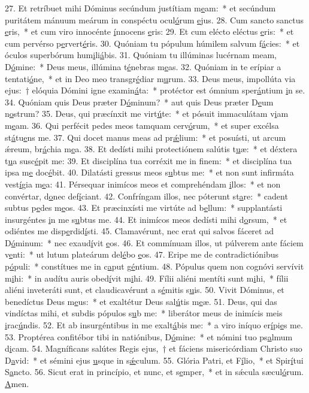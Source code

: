 27. Et retríbuet mihi Dóminus secúndum justítiam m\uline{e}am:~* et secúndum puritátem mánuum meárum in conspéctu ocul\uline{ó}rum \uline{e}jus.
28. Cum sancto sanctus \uline{e}ris,~* et cum viro innocénte \uline{í}nnocens \uline{e}ris:
29. Et cum elécto eléctus \uline{e}ris:~* et cum pervérso p\uline{e}rvert\uline{é}ris.
30. Quóniam tu pópulum húmilem salvum f\uline{á}cies:~* et óculos superbórum hum\uline{i}li\uline{á}bis.
31. Quóniam tu illúminas lucérnam meam, D\uline{ó}mine:~* Deus meus, illúmina t\uline{é}nebras m\uline{e}as.
32. Quóniam in te erípiar a tentati\uline{ó}ne,~* et in Deo meo transgr\uline{é}diar m\uline{u}rum.
33. Deus meus, impollúta via ejus:~† elóquia Dómini igne examin\uline{á}ta:~* protéctor est ómnium sper\uline{á}ntium \uline{i}n se.
34. Quóniam quis Deus præter D\uline{ó}minum?~* aut quis Deus præter D\uline{e}um n\uline{o}strum?
35. Deus, qui præcínxit me virt\uline{ú}te:~* et pósuit immaculátam v\uline{i}am m\uline{e}am.
36. Qui perfécit pedes meos tamquam cerv\uline{ó}rum,~* et super excélsa st\uline{á}tu\uline{e}ns me.
37. Qui docet manus meas ad pr\uline{ǽ}lium:~* et posuísti, ut arcum ǽreum, br\uline{á}chia m\uline{e}a.
38. Et dedísti mihi protectiónem salútis t\uline{u}æ:~* et déxtera t\uline{u}a susc\uline{é}pit me:
39. Et disciplína tua corréxit me in f\uline{i}nem:~* et disciplína tua ipsa m\uline{e} doc\uline{é}bit.
40. Dilatásti gressus meos s\uline{u}btus me:~* et non sunt infirmáta vest\uline{í}gia m\uline{e}a:
41. Pérsequar inimícos meos et comprehéndam \uline{i}llos:~* et non convértar, d\uline{o}nec def\uline{í}ciant.
42. Confríngam illos, nec póterunt st\uline{a}re:~* cadent subtus p\uline{e}des m\uline{e}os.
43. Et præcinxísti me virtúte ad b\uline{e}llum:~* supplantásti insurgéntes \uline{i}n me s\uline{u}btus me.
44. Et inimícos meos dedísti mihi d\uline{o}rsum,~* et odiéntes me disp\uline{e}rdid\uline{í}sti.
45. Clamavérunt, nec erat qui salvos fáceret ad D\uline{ó}minum:~* nec exaud\uline{í}vit \uline{e}os.
46. Et commínuam illos, ut púlverem ante fáciem v\uline{e}nti:~* ut lutum plateárum del\uline{é}bo \uline{e}os.
47. Eripe me de contradictiónibus p\uline{ó}puli:~* constítues me in c\uline{a}put g\uline{é}ntium.
48. Pópulus quem non cognóvi servívit m\uline{i}hi:~* in audítu auris obed\uline{í}vit m\uline{i}hi.
49. Fílii aliéni mentíti sunt m\uline{i}hi,~* fílii aliéni inveteráti sunt, et claudicavérunt a s\uline{é}mitis s\uline{u}is.
50. Vivit Dóminus, et benedíctus Deus m\uline{e}us:~* et exaltétur Deus sal\uline{ú}tis m\uline{e}æ.
51. Deus, qui das vindíctas mihi, et subdis pópulos s\uline{u}b me:~* liberátor meus de inimícis meis \uline{i}rac\uline{ú}ndis.
52. Et ab insurgéntibus in me exalt\uline{á}bis me:~* a viro iníquo er\uline{í}pi\uline{e}s me.
53. Proptérea confitébor tibi in natiónibus, D\uline{ó}mine:~* et nómini tuo ps\uline{a}lmum d\uline{i}cam.
54. Magníficans salútes Regis ejus,~† et fáciens misericórdiam Christo suo D\uline{a}vid:~* et sémini ejus \uline{u}sque in s\uline{ǽ}culum.
55. Glória Patri, et F\uline{í}lio,~* et Spir\uline{í}tui S\uline{a}ncto.
56. Sicut erat in princípio, et nunc, et s\uline{e}mper,~* et in sǽcula sæcul\uline{ó}rum. \uline{A}men.
